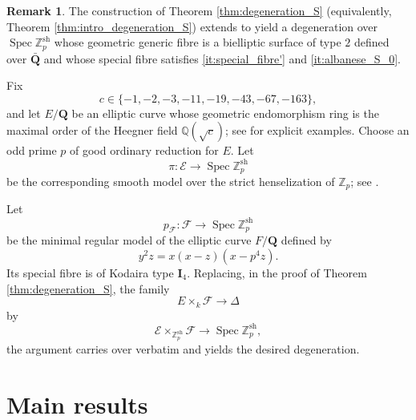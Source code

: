 \documentclass[11pt,letterpaper]{amsart}
\newcommand{\ca}[1]{{\mathcal{#1}}}
\numberwithin{equation}{section}
\theoremstyle{definition}
\newtheorem{remark}[theorem]{Remark}
\theoremstyle{remark}
\newcommand{\Q}{\mathbb{Q}}
\newcommand{\Z}{\mathbb{Z}}
\newcommand{\bbQ}{\mathbf{Q}}
\DeclareMathOperator{\Spec}{Spec}
\begin{document}
\begin{remark}\label{rem:degen_over_Q}
The construction of Theorem \ref{thm:degeneration_S} (equivalently, Theorem \ref{thm:intro_degeneration_S}) extends to yield a degeneration over $\Spec \Z_p^{\mathrm{sh}}$ whose geometric generic fibre is a bielliptic surface of type $2$ defined over $\bar{\bbQ}$ and whose special fibre satisfies \eqref{it:special_fibre'} and \eqref{it:albanese_S_0}.

Fix
$$
c \in \{-1,-2,-3,-11,-19,-43,-67,-163\},
$$
and let $E/\bbQ$ be an elliptic curve whose geometric endomorphism ring is the maximal order of the Heegner field $\Q(\sqrt{c})$; see \cite{lmfdb} for explicit examples. Choose an odd prime $p$ of good ordinary reduction for $E$. Let
$$
\pi \colon \ca E \longrightarrow \Spec \Z_{p}^{\mathrm{sh}}
$$
be the corresponding smooth model over the strict henselization of $\Z_p$; see \cite[Chapter I, \S4]{milne_etale}.

Let
$$
p_{\ca F} \colon \ca F \longrightarrow \Spec \Z_{p}^{\mathrm{sh}}
$$
be the minimal regular model of the elliptic curve $F/\bbQ$ defined by
$$
y^2 z = x(x-z)(x-p^4 z).
$$
Its special fibre is of Kodaira type $\mathbf{I}_4$. Replacing, in the proof of Theorem \ref{thm:degeneration_S}, the family
$$
E \times_k \ca F \longrightarrow \Delta
$$
by
$$
\ca E \times_{\Z_{p}^{\mathrm{sh}}} \ca F \longrightarrow \Spec \Z_{p}^{\mathrm{sh}},
$$
the argument carries over verbatim and yields the desired degeneration.
\end{remark}

\section{Main results}\label{sec:final}
\end{document}
